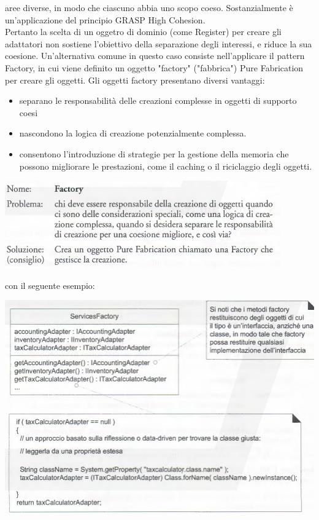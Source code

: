 \documentclass[a4paper,12pt, oneside]{book}
\begin{document}
aree diverse, in modo che ciascuno abbia uno scopo coeso. Sostanzialmente è un'applicazione del principio GRASP High Cohesion.\\
Pertanto la scelta di un oggetro di dominio (come Register) per creare gli adattatori non
sostiene l'obiettivo della separazione degli interessi, e riduce la sua coesione.
Un'alternativa comune in questo caso consiste nell'applicare il pattern Factory, in cui
viene definito un oggetto "factory" ("fabbrica") Pure Fabrication per creare gli oggetti.
Gli oggetti factory presentano diversi vantaggi:
\begin{itemize}
\item separano le responsabilità delle creazioni complesse in oggetti di supporto coesi
\item nascondono la logica di creazione potenzialmente complessa.
\item consentono l'introduzione di strategie per la gestione della memoria che possono
migliorare le prestazioni, come il caching o il riciclaggio degli oggetti.
\end{itemize}
\begin{center}
\includegraphics[scale = 0.7]{img/gof6.png}
\end{center}
con il seguente esempio:
\begin{center}
\includegraphics[scale = 0.7]{img/gof7.png}
\end{center}
\end{document}

